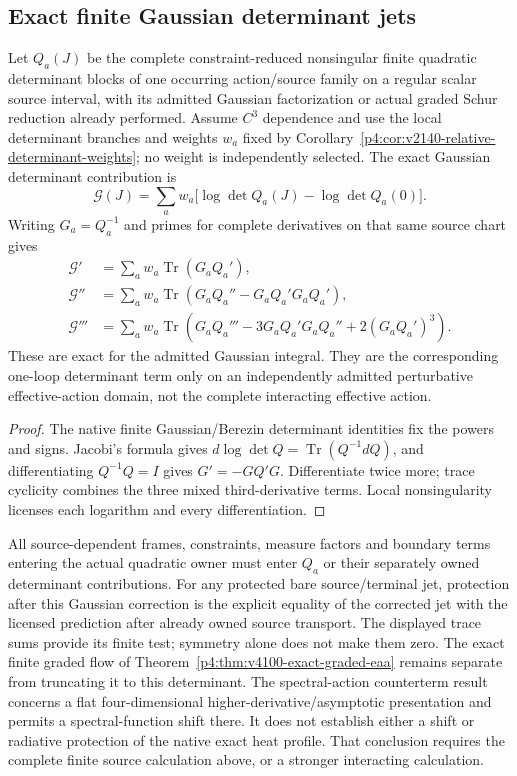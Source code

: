 \documentclass[12pt,a4paper]{article}
\begin{document}
\subsection{Exact finite Gaussian determinant jets}
\begin{theorem}
\label{p4:thm:v2210-lit-determinant-jets}
Let $Q_a(J)$ be the complete constraint-reduced nonsingular finite
quadratic determinant blocks of one occurring action/source family on a regular
scalar source interval, with its admitted Gaussian factorization or actual
graded Schur reduction already performed. Assume $C^3$ dependence and use the local determinant
branches and weights $w_a$ fixed by
Corollary~\ref{p4:cor:v2140-relative-determinant-weights}; no weight is
independently selected. The exact Gaussian determinant contribution is
\[
 \mathcal G(J)=\sum_aw_a\bigl[\log\det Q_a(J)-\log\det Q_a(0)\bigr].
\]
Writing $G_a=Q_a^{-1}$ and primes for complete derivatives on that same
source chart gives
\begin{align*}
 \mathcal G'&=\sum_aw_a\operatorname{Tr}(G_aQ_a'),\\
 \mathcal G''&=\sum_aw_a\operatorname{Tr}
       (G_aQ_a''-G_aQ_a'G_aQ_a'),\\
 \mathcal G'''&=\sum_aw_a\operatorname{Tr}
       (G_aQ_a'''-3G_aQ_a'G_aQ_a''+2(G_aQ_a')^3).
\end{align*}
These are exact for the admitted Gaussian integral. They are the corresponding
one-loop determinant term only on an independently admitted perturbative
effective-action domain, not the complete interacting effective action.
\end{theorem}
\begin{proof}
The native finite Gaussian/Berezin determinant identities fix the powers
and signs. Jacobi's formula gives $d\log\det Q=\operatorname{Tr}(Q^{-1}dQ)$,
and differentiating $Q^{-1}Q=I$ gives $G'=-GQ'G$. Differentiate twice more;
trace cyclicity combines the three mixed third-derivative terms. Local
nonsingularity licenses each logarithm and every differentiation.
\end{proof}
All source-dependent frames, constraints, measure factors and boundary
terms entering the actual quadratic owner must enter $Q_a$ or their
separately owned determinant contributions. For any protected bare
source/terminal jet, protection after this Gaussian correction is the
explicit equality of the corrected jet with the licensed prediction after
already owned source transport. The displayed trace sums provide its finite
test; symmetry alone does not make them zero. The exact finite graded flow
of Theorem~\ref{p4:thm:v4100-exact-graded-eaa} remains separate from
truncating it to this determinant. The spectral-action counterterm result
\cite{LitQFTvanSuijlekom2012} concerns a flat four-dimensional
higher-derivative/asymptotic presentation and permits a spectral-function
shift there. It does not establish either a shift or radiative protection
of the native exact heat profile. That conclusion requires the complete
finite source calculation above, or a stronger interacting calculation.
\end{document}
